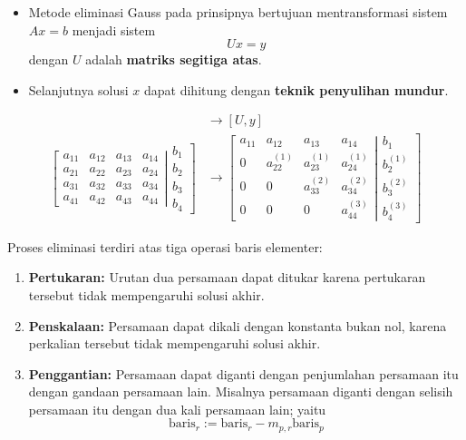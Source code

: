 \documentclass[pdflatex,compress,mathserif]{beamer}
\begin{document}
\begin{frame}
	\begin{itemize}
		\item Metode eliminasi Gauss pada prinsipnya bertujuan mentransformasi sistem $ Ax = b $ menjadi sistem \[ Ux = y \] dengan $ U $ adalah \textbf{matriks segitiga atas}.
		\item Selanjutnya solusi $ x $ dapat dihitung dengan \textbf{teknik penyulihan mundur}.
	\end{itemize}
\end{frame}

\begin{frame}
	\begin{align*}
	[A,b]
	&\rightarrow
	[U,y]
	\\
	\left[
	\begin{matrix}
	a_{11} & a_{12} & a_{13} & a_{14}\\
	a_{21} & a_{22} & a_{23} & a_{24}\\
	a_{31} & a_{32} & a_{33} & a_{34}\\
	a_{41} & a_{42} & a_{43} & a_{44}
	\end{matrix}
	\right|
	\left.
	\begin{matrix}
	b_{1}\\
	b_{2}\\
	b_{3}\\
	b_{4}
	\end{matrix}
	\right]
	&\rightarrow
	\left[
	\begin{matrix}
	a_{11} & a_{12} & a_{13} & a_{14}\\
	0 & a_{22}^{(1)} & a_{23}^{(1)} & a_{24}^{(1)}\\
	0 & 0 & a_{33}^{(2)} & a_{34}^{(2)}\\
	0 & 0 & 0 & a_{44}^{(3)}
	\end{matrix}
	\right|
	\left.
	\begin{matrix}
	b_{1}\\
	b_{2}^{(1)}\\
	b_{3}^{(2)}\\
	b_{4}^{(3)}
	\end{matrix}
	\right]
	\end{align*}
\end{frame}

\begin{frame}
	Proses eliminasi terdiri atas tiga operasi baris elementer:
	\begin{enumerate}
		\item \textbf{Pertukaran:} Urutan dua persamaan dapat ditukar karena pertukaran tersebut tidak mempengaruhi solusi akhir.
		\item \textbf{Penskalaan:} Persamaan dapat dikali dengan konstanta bukan nol, karena perkalian tersebut tidak mempengaruhi solusi akhir.
		\item \textbf{Penggantian:} Persamaan dapat diganti dengan penjumlahan persamaan itu dengan gandaan persamaan lain. Misalnya persamaan diganti dengan selisih persamaan itu dengan dua kali persamaan lain; yaitu
		\[ \text{baris}_r := \text{baris}_r - m_{p,r}\text{baris}_p \]
	\end{enumerate}
\end{frame}
\end{document}
